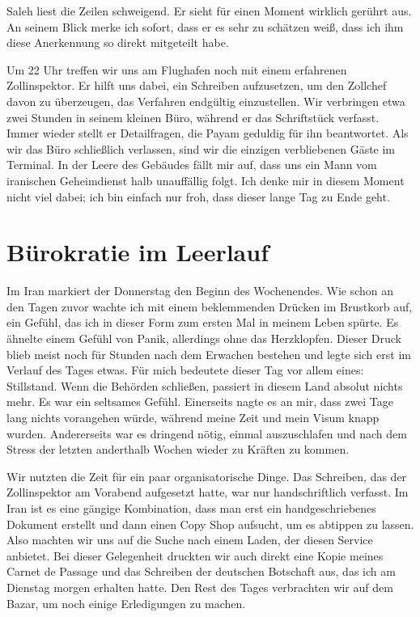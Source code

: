 Saleh liest die Zeilen schweigend. Er sieht für einen Moment wirklich gerührt aus. An seinem Blick merke ich sofort, dass er es sehr zu schätzen weiß, dass ich ihm diese Anerkennung so direkt mitgeteilt habe.

Um 22 Uhr treffen wir uns am Flughafen noch mit einem erfahrenen Zollinspektor. Er hilft uns dabei, ein Schreiben aufzusetzen, um den Zollchef davon zu überzeugen, das Verfahren endgültig einzustellen. Wir verbringen etwa zwei Stunden in seinem kleinen Büro, während er das Schriftstück verfasst. Immer wieder stellt er Detailfragen, die Payam geduldig für ihn beantwortet. Als wir das Büro schließlich verlassen, sind wir die einzigen verbliebenen Gäste im Terminal. In der Leere des Gebäudes fällt mir auf, dass uns ein Mann vom iranischen Geheimdienst halb unauffällig folgt. Ich denke mir in diesem Moment nicht viel dabei; ich bin einfach nur froh, dass dieser lange Tag zu Ende geht.

\chapter*{Bürokratie im Leerlauf}

Im Iran markiert der Donnerstag den Beginn des Wochenendes. Wie schon an den Tagen zuvor wachte ich mit einem beklemmenden Drücken im Brustkorb auf, ein Gefühl, das ich in dieser Form zum ersten Mal in meinem Leben spürte. Es ähnelte einem Gefühl von Panik, allerdings ohne das Herzklopfen. Dieser Druck blieb meist noch für Stunden nach dem Erwachen bestehen und legte sich erst im Verlauf des Tages etwas. Für mich bedeutete dieser Tag vor allem eines: Stillstand. Wenn die Behörden schließen, passiert in diesem Land absolut nichts mehr. Es war ein seltsames Gefühl. Einerseits nagte es an mir, dass zwei Tage lang nichts vorangehen würde, während meine Zeit und mein Visum knapp wurden. Andererseits war es dringend nötig, einmal auszuschlafen und nach dem Stress der letzten anderthalb Wochen wieder zu Kräften zu kommen.

Wir nutzten die Zeit für ein paar organisatorische Dinge. Das Schreiben, das der Zollinspektor am Vorabend aufgesetzt hatte, war nur handschriftlich verfasst. Im Iran ist es eine gängige Kombination, dass man erst ein handgeschriebenes Dokument erstellt und dann einen Copy Shop aufsucht, um es abtippen zu lassen. Also machten wir uns auf die Suche nach einem Laden, der diesen Service anbietet. Bei dieser Gelegenheit druckten wir auch direkt eine Kopie meines Carnet de Passage und das Schreiben der deutschen Botschaft aus, das ich am Dienstag morgen erhalten hatte. Den Rest des Tages verbrachten wir auf dem Bazar, um noch einige Erledigungen zu machen.

